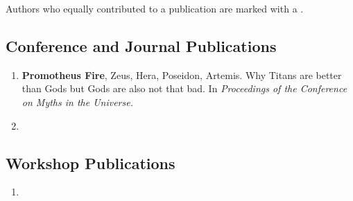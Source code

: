 Authors who equally contributed to a publication are marked with a \textdagger.

\subsection{Conference and Journal Publications}

\begin{enumerate}
	\item \textbf{Promotheus Fire}\ec, Zeus\ec, Hera, Poseidon, Artemis. Why Titans are better than Gods but Gods are also not that bad. In \textit{Proceedings of the  Conference on Myths in the Universe.}
	\item \lipsum[1][1-3]
	\setcounter{publicationCounter}{\value{enumi}}	%
\end{enumerate}

\subsection{Workshop Publications}
\begin{enumerate}
	\setcounter{enumi}{\value{publicationCounter}}	%
	\item \lipsum[1][4-7]
	\setcounter{publicationCounter}{\value{enumi}}	%
\end{enumerate}

